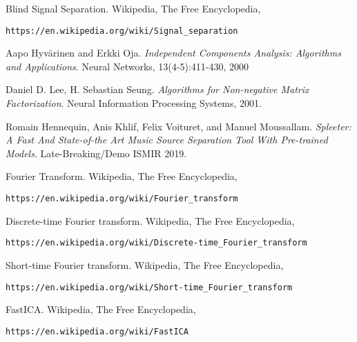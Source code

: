 \documentclass[a4paper,12pt]{article}
\begin{document}
\begin{thebibliography}{9}
Blind Signal Separation. Wikipedia, The Free Encyclopedia,
 
\texttt{https://en.wikipedia.org/wiki/Signal\_separation}

Aapo Hyvärinen and Erkki Oja. \textit{Independent Components Analysis: Algorithms and Applications}. Neural Networks, 13(4-5):411-430, 2000

Daniel D. Lee, H. Sebastian Seung. \textit{Algorithms for Non-negative Matrix Factorization}. Neural Information Processing Systems, 2001.

Romain Hennequin, Anis Khlif, Felix Voituret, and Manuel Moussallam. \textit{Spleeter: A Fast And State-of-the Art Music Source Separation Tool With Pre-trained Models}. Late-Breaking/Demo ISMIR 2019.

Fourier Transform. Wikipedia, The Free Encyclopedia,

\texttt{https://en.wikipedia.org/wiki/Fourier\_transform}

Discrete-time Fourier transform. Wikipedia, The Free Encyclopedia,

\texttt{https://en.wikipedia.org/wiki/Discrete-time\_Fourier\_transform}

Short-time Fourier transform. Wikipedia, The Free Encyclopedia,

\texttt{https://en.wikipedia.org/wiki/Short-time\_Fourier\_transform}

FastICA. Wikipedia, The Free Encyclopedia,

\texttt{https://en.wikipedia.org/wiki/FastICA}

\end{thebibliography}

	
\end{document}
